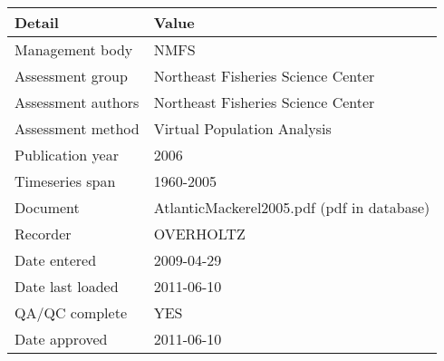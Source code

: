 \begin{table}[htb]
\centering
\begin{tabular}{lp{7cm}}
\toprule
Detail & Value \\
\midrule
Management body    & NMFS                                       \\
Assessment group   & Northeast Fisheries Science Center         \\
Assessment authors & Northeast Fisheries Science Center         \\
Assessment method  & Virtual Population Analysis                \\
Publication year   & 2006                                       \\
Timeseries span    & 1960-2005                                  \\
Document           & AtlanticMackerel2005.pdf (pdf in database) \\
Recorder           & OVERHOLTZ                                  \\
Date entered       & 2009-04-29                                 \\
Date last loaded   & 2011-06-10                                 \\
QA/QC complete     & YES                                        \\
Date approved      & 2011-06-10                                 \\
\bottomrule
\end{tabular}
\label{tab:assessdet}
\end{table}

